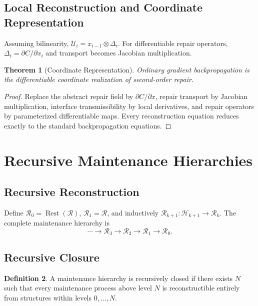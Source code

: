 \documentclass[12pt,oneside]{article}
\theoremstyle{plain}
\newtheorem{theorem}{Theorem}[section]
\theoremstyle{definition}
\newtheorem{definition}[theorem]{Definition}
\theoremstyle{remark}
\theoremstyle{plain}
\DeclareMathOperator{\Rest}{Rest}
\newcommand{\Hist}{\mathcal{H}}
\begin{document}
\subsection{Local Reconstruction and Coordinate Representation}

Assuming bilinearity, $\mathcal{U}_i = x_{i-1} \otimes \Delta_i$. For differentiable repair
operators, $\Delta_i = \partial C / \partial x_i$ and transport becomes Jacobian multiplication.

\begin{theorem}[Coordinate Representation]
Ordinary gradient backpropagation is the differentiable coordinate realization of second-order
repair.
\end{theorem}

\begin{proof}
Replace the abstract repair field by $\partial C / \partial x$, repair transport by Jacobian
multiplication, interface transmissibility by local derivatives, and repair operators by
parameterized differentiable maps. Every reconstruction equation reduces exactly to the standard
backpropagation equations.
\end{proof}

\section{Recursive Maintenance Hierarchies}

\subsection{Recursive Reconstruction}

Define $\mathcal{R}_0 = \Rest(\mathcal{R})$, $\mathcal{R}_1 = \mathcal{R}$, and inductively
$\mathcal{R}_{k+1} : \Hist_{k+1} \rightarrow \mathcal{R}_k$. The complete maintenance hierarchy
is
\[
\cdots \rightarrow \mathcal{R}_3 \rightarrow \mathcal{R}_2 \rightarrow \mathcal{R}_1
\rightarrow \mathcal{R}_0.
\]

\subsection{Recursive Closure}

\begin{definition}
A maintenance hierarchy is recursively closed if there exists $N$ such that every maintenance
process above level $N$ is reconstructible entirely from structures within levels $0, \ldots, N$.
\end{definition}
\end{document}
